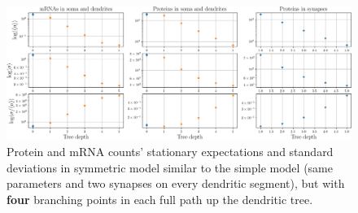 \documentclass[a4paper, 11pt]{article}
\begin{document}
\begin{figure}
  \begin{center}
    \includegraphics[width=15cm]{img/4_forks_plots_trimmed.png}
  \end{center}
    \caption{Protein and mRNA counts' stationary expectations and standard deviations in symmetric model similar to the simple model (same parameters and two synapses on every dendritic segment), but with {\bf four} branching points in each full path up the dendritic tree.}
  \label{fig:4_forks_noise}
\end{figure}
\end{document}
